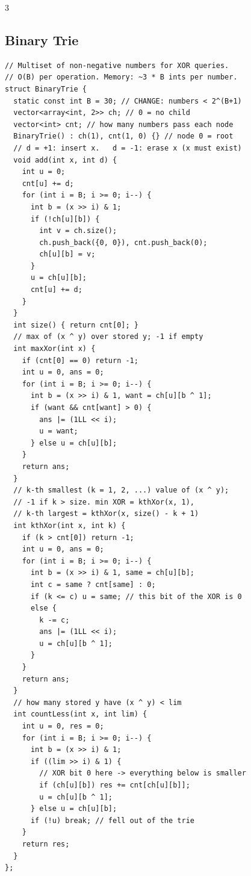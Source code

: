 \documentclass[8pt, a4paper]{article}
\begin{document}
\begin{multicols*}{3}
\subsection{Binary Trie}
\begin{lstlisting}
// Multiset of non-negative numbers for XOR queries.
// O(B) per operation. Memory: ~3 * B ints per number.
struct BinaryTrie {
  static const int B = 30; // CHANGE: numbers < 2^(B+1)
  vector<array<int, 2>> ch; // 0 = no child
  vector<int> cnt; // how many numbers pass each node
  BinaryTrie() : ch(1), cnt(1, 0) {} // node 0 = root
  // d = +1: insert x.   d = -1: erase x (x must exist)
  void add(int x, int d) {
    int u = 0;
    cnt[u] += d;
    for (int i = B; i >= 0; i--) {
      int b = (x >> i) & 1;
      if (!ch[u][b]) {
        int v = ch.size();
        ch.push_back({0, 0}), cnt.push_back(0);
        ch[u][b] = v;
      }
      u = ch[u][b];
      cnt[u] += d;
    }
  }
  int size() { return cnt[0]; }
  // max of (x ^ y) over stored y; -1 if empty
  int maxXor(int x) {
    if (cnt[0] == 0) return -1;
    int u = 0, ans = 0;
    for (int i = B; i >= 0; i--) {
      int b = (x >> i) & 1, want = ch[u][b ^ 1];
      if (want && cnt[want] > 0) {
        ans |= (1LL << i);
        u = want;
      } else u = ch[u][b];
    }
    return ans;
  }
  // k-th smallest (k = 1, 2, ...) value of (x ^ y);
  // -1 if k > size. min XOR = kthXor(x, 1),
  // k-th largest = kthXor(x, size() - k + 1)
  int kthXor(int x, int k) {
    if (k > cnt[0]) return -1;
    int u = 0, ans = 0;
    for (int i = B; i >= 0; i--) {
      int b = (x >> i) & 1, same = ch[u][b];
      int c = same ? cnt[same] : 0;
      if (k <= c) u = same; // this bit of the XOR is 0
      else {
        k -= c;
        ans |= (1LL << i);
        u = ch[u][b ^ 1];
      }
    }
    return ans;
  }
  // how many stored y have (x ^ y) < lim
  int countLess(int x, int lim) {
    int u = 0, res = 0;
    for (int i = B; i >= 0; i--) {
      int b = (x >> i) & 1;
      if ((lim >> i) & 1) {
        // XOR bit 0 here -> everything below is smaller
        if (ch[u][b]) res += cnt[ch[u][b]];
        u = ch[u][b ^ 1];
      } else u = ch[u][b];
      if (!u) break; // fell out of the trie
    }
    return res;
  }
};
\end{lstlisting}

\end{multicols*}
\end{document}
